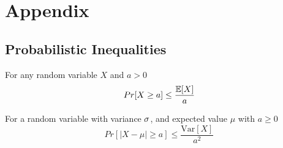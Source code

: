 \chapter{Appendix}
\section{Probabilistic Inequalities}
\begin{theorem}\label{markov}
	For any random variable $X$ and $a>0$ $$Pr[X\geq a]\leq \frac{\mathbb{E}[X]}{a}$$
\end{theorem}
\begin{theorem}\label{chebyshev}
	For a random variable with variance $\sigma$, and expected value $\mu$ with $a\geq 0$ $$Pr[|X-\mu|\geq a]\leq \frac{\text{Var}[X]}{a^2}$$
\end{theorem}